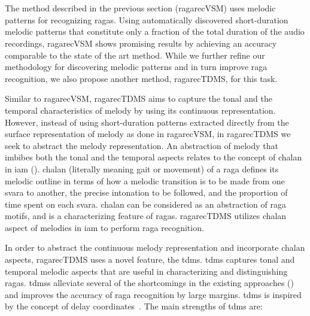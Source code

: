 \section{}
\label{sec:tdms_raga_recognition}

The method described in the previous section (\acrshort{ragarecVSM}) uses melodic patterns for recognizing \glspl{raga}. Using automatically discovered short-duration melodic patterns that constitute only a fraction of the total duration of the audio recordings, \acrshort{ragarecVSM} shows promising results by achieving an accuracy comparable to the state of the art method. While we further refine our methodology for discovering melodic patterns and in turn improve \gls{raga} recognition, we also propose another method, \acrshort{ragarecTDMS}, for this task. 

Similar to \acrshort{ragarecVSM}, \acrshort{ragarecTDMS} aims to capture the tonal and the temporal characteristics of melody by using its continuous representation. However, instead of using short-duration patterns extracted directly from the surface representation of melody as done in \acrshort{ragarecVSM}, in \acrshort{ragarecTDMS} we seek to abstract the melody representation. An abstraction of melody that imbibes both the tonal and the temporal aspects relates to the concept of \gls{chalan} in \gls{iam} (). \Gls{chalan} (literally meaning gait or movement) of a \gls{raga} defines its melodic outline in terms of how a melodic transition is to be made from one \gls{svara} to another, the precise intonation to be followed, and the proportion of time spent on each \gls{svara}. \Gls{chalan} can be considered as an abstraction of \gls{raga} motifs, and is a characterizing feature of \glspl{raga}. \acrshort{ragarecTDMS} utilizes \gls{chalan} aspect of melodies in \gls{iam} to perform \gls{raga} recognition.

In order to abstract the continuous melody representation and incorporate \gls{chalan} aspects, \acrshort{ragarecTDMS} uses a novel feature,  the \acrfull{tdms}. \gls{tdms} captures tonal and temporal melodic aspects that are useful in characterizing and distinguishing \glspl{raga}. \Glspl{tdms} alleviate several of the shortcomings in the existing approaches () and improves the accuracy of \gls{raga} recognition by large margins. \Gls{tdms} is inspired by the concept of delay coordinates~\citep{takens1981detecting}. The main strengths of \gls{tdms} are:


